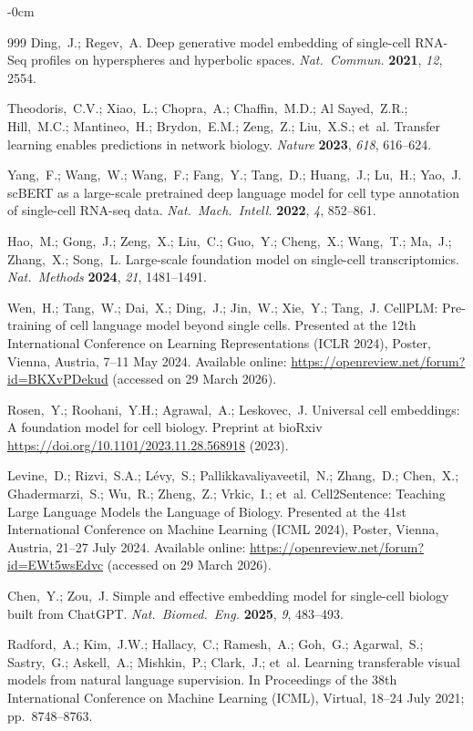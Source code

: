 \documentclass[11pt,a4paper]{article}
\newlength{\extralength}
\begin{document}
\begin{adjustwidth}{-\extralength}{0cm}
\begin{thebibliography}{999}
Ding,~J.; Regev,~A. Deep generative model embedding of single-cell RNA-Seq profiles on hyperspheres and hyperbolic spaces. {\em Nat.\ Commun.} {\bf 2021}, {\em 12}, 2554.

Theodoris,~C.V.; Xiao,~L.; Chopra,~A.; Chaffin,~M.D.; Al Sayed,~Z.R.; Hill,~M.C.; Mantineo,~H.; Brydon,~E.M.; Zeng,~Z.; Liu,~X.S.; et~al. Transfer learning enables predictions in network biology. {\em Nature} {\bf 2023}, {\em 618}, 616--624.

Yang,~F.; Wang,~W.; Wang,~F.; Fang,~Y.; Tang,~D.; Huang,~J.; Lu,~H.; Yao,~J. scBERT as a large-scale pretrained deep language model for cell type annotation of single-cell RNA-seq data. {\em Nat.\ Mach.\ Intell.} {\bf 2022}, {\em 4}, 852--861.

Hao,~M.; Gong,~J.; Zeng,~X.; Liu,~C.; Guo,~Y.; Cheng,~X.; Wang,~T.; Ma,~J.; Zhang,~X.; Song,~L. Large-scale foundation model on single-cell transcriptomics. {\em Nat.\ Methods} {\bf 2024}, {\em 21}, 1481--1491.

Wen,~H.; Tang,~W.; Dai,~X.; Ding,~J.; Jin,~W.; Xie,~Y.; Tang,~J. CellPLM: Pre-training of cell language model beyond single cells. Presented at the 12th International Conference on Learning Representations (ICLR 2024), Poster, Vienna, Austria, 7--11 May 2024. Available online: \url{https://openreview.net/forum?id=BKXvPDekud} (accessed on 29 March 2026).

Rosen,~Y.; Roohani,~Y.H.; Agrawal,~A.; Leskovec,~J. Universal cell embeddings: A foundation model for cell biology. Preprint at bioRxiv \url{https://doi.org/10.1101/2023.11.28.568918} (2023).

Levine,~D.; Rizvi,~S.A.; L\'{e}vy,~S.; Pallikkavaliyaveetil,~N.; Zhang,~D.; Chen,~X.; Ghadermarzi,~S.; Wu,~R.; Zheng,~Z.; Vrkic,~I.; et~al. Cell2Sentence: Teaching Large Language Models the Language of Biology. Presented at the 41st International Conference on Machine Learning (ICML 2024), Poster, Vienna, Austria, 21--27 July 2024. Available online: \url{https://openreview.net/forum?id=EWt5wsEdvc} (accessed on 29 March 2026).

Chen,~Y.; Zou,~J. Simple and effective embedding model for single-cell biology built from ChatGPT. {\em Nat.\ Biomed.\ Eng.} {\bf 2025}, {\em 9}, 483--493.

Radford,~A.; Kim,~J.W.; Hallacy,~C.; Ramesh,~A.; Goh,~G.; Agarwal,~S.; Sastry,~G.; Askell,~A.; Mishkin,~P.; Clark,~J.; et~al. Learning transferable visual models from natural language supervision. In Proceedings of the 38th International Conference on Machine Learning (ICML), Virtual, 18--24 July 2021; pp.\ 8748--8763.


\end{thebibliography}
\end{adjustwidth}
\end{document}
